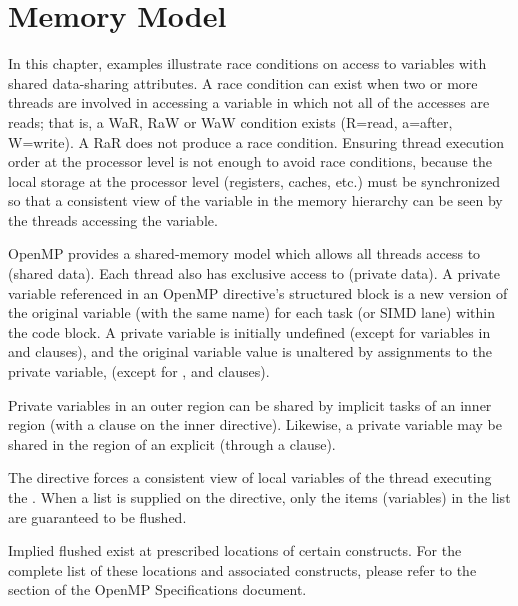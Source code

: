 \pagebreak
\chapter{Memory Model}
\label{chap:memory_model}

In this chapter, examples illustrate race conditions on access to variables with
shared data-sharing attributes.  A race condition can exist when two
or more threads are involved in accessing a variable in which not all
of the accesses are reads; that is, a WaR, RaW or WaW condition
exists (R=read, a=after, W=write). A RaR does not produce a race condition.
 Ensuring thread execution order at
the processor level is not enough to avoid race conditions, because the
local storage at the processor level (registers, caches, etc.)
must be synchronized so that a consistent view of the variable in the
memory hierarchy can be seen by the threads accessing the variable.

OpenMP provides a shared-memory model which allows all threads access
to  (shared data).  Each thread also has exclusive
access to  (private data).  A private
variable referenced in an OpenMP directive's structured block is a
new version of the original variable (with the same name) for each
task (or SIMD lane) within the code block.  A private variable is
initially undefined (except for variables in 
and  clauses), and the original variable value is
unaltered by assignments to the private variable, (except for
,  and  clauses).

Private variables in an outer  region can be
shared by implicit tasks of an inner  region 
(with a  clause on the inner  directive).
Likewise, a private variable may be shared in the region of an
explicit  (through a  clause).


The  directive forces a  consistent view of local variables
of the thread executing the .
When a list is supplied on the directive, only the items (variables)
in the list are guaranteed to be flushed.

Implied flushed exist at prescribed locations of certain constructs. 
For the complete list of these locations and associated constructs,
please refer to the  section of the OpenMP 
Specifications document.

